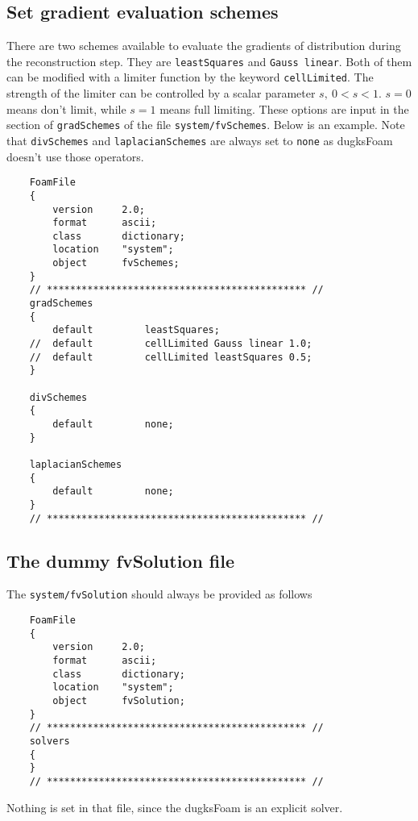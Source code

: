 \subsection{Set gradient evaluation schemes}
There are two schemes available to evaluate the gradients of distribution during the reconstruction step.
They are \verb|leastSquares| and \verb|Gauss linear|.
Both of them can be modified with a limiter function by the keyword \verb|cellLimited|.
The strength of the limiter can be controlled by a scalar parameter $s,~0 < s < 1$.
$s=0$ means don't limit, while $s=1$ means full limiting.
These options are input in the section of \verb|gradSchemes| of the file \verb|system/fvSchemes|. Below is an example.
Note that \verb|divSchemes| and \verb|laplacianSchemes| are always set to \verb|none| as dugksFoam doesn't use those operators.
\begin{verbatim}
    FoamFile
    {
        version     2.0;
        format      ascii;
        class       dictionary;
        location    "system";
        object      fvSchemes;
    }
    // ********************************************* //
    gradSchemes
    {
        default         leastSquares;
    //  default         cellLimited Gauss linear 1.0;
    //  default         cellLimited leastSquares 0.5;
    }

    divSchemes
    {
        default         none;
    }

    laplacianSchemes
    {
        default         none;
    }
    // ********************************************* //
\end{verbatim}

\subsection{The dummy  fvSolution file}
The  \verb|system/fvSolution| should always be provided as follows
\begin{verbatim}
    FoamFile
    {
        version     2.0;
        format      ascii;
        class       dictionary;
        location    "system";
        object      fvSolution;
    }
    // ********************************************* //
    solvers
    {
    }
    // ********************************************* //
\end{verbatim}
Nothing is set in that file, since the dugksFoam is an explicit solver.

